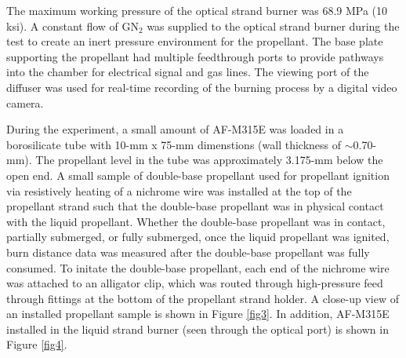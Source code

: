 \documentclass{article}
\begin{document}
The maximum working pressure of the optical strand burner was 68.9 MPa (10 ksi). A constant flow of GN$_2$ was
supplied to the optical strand burner during the test to create an inert pressure environment for the propellant.
The base plate supporting the propellant had multiple feedthrough ports to provide pathways into the chamber for
electrical signal and gas lines. The viewing port of the diffuser was used for real-time recording of the burning
process by a digital video camera.

During the experiment, a small amount of AF-M315E was loaded in a borosilicate tube with 10-mm x 75-mm dimenstions
(wall thickness of $\sim$0.70-mm). The propellant level in the tube was approximately 3.175-mm below the open end.
A small sample of double-base propellant used for propellant ignition via resistively heating of a nichrome wire
was installed at the top of the propellant strand such that the double-base propellant was in physical contact with
the liquid propellant. Whether the double-base propellant was in contact, partially submerged, or fully submerged,
once the liquid propellant was ignited, burn distance data was measured after the double-base propellant was fully
consumed. To initate the double-base propellant, each end of the nichrome wire was attached to an alligator clip, 
which was routed through high-pressure feed through fittings at the bottom of the propellant strand holder. A
close-up view of an installed propellant sample is shown in Figure \ref{fig3}. In addition, AF-M315E installed in
the liquid strand burner (seen through the optical port) is shown in Figure \ref{fig4}.
\end{document}
